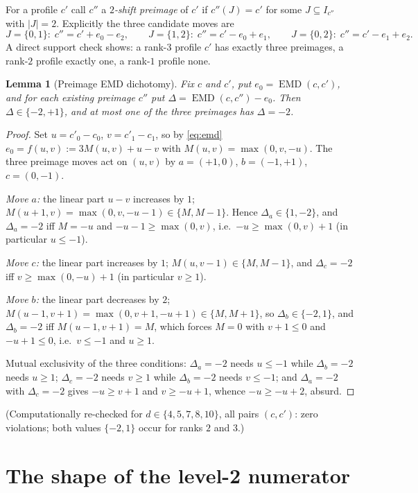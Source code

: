 \documentclass[11pt]{article}
\newtheorem{lemma}[theorem]{Lemma}
\newcommand{\EMD}{\operatorname{EMD}}
\begin{document}
For a profile $c'$ call $c''$ a \emph{$2$-shift preimage} of $c'$ if
$c''(J)=c'$ for some $J\subseteq I_{c''}$ with $|J|=2$. Explicitly the three
candidate moves are
\[
J=\{0,1\}:\; c''=c'+e_0-e_2,\qquad
J=\{1,2\}:\; c''=c'-e_0+e_1,\qquad
J=\{0,2\}:\; c''=c'-e_1+e_2 .
\]
A direct support check shows: a rank-$3$ profile $c'$ has exactly three
preimages, a rank-$2$ profile exactly one, a rank-$1$ profile none.

\begin{lemma}[Preimage EMD dichotomy]\label{lem:dichotomy}
Fix $c$ and $c'$, put $e_0=\EMD(c,c')$, and for each existing preimage $c''$
put $\Delta=\EMD(c,c'')-e_0$. Then $\Delta\in\{-2,+1\}$, and at most one of
the three preimages has $\Delta=-2$.
\end{lemma}

\begin{proof}
Set $u=c'_0-c_0$, $v=c'_1-c_1$, so by \eqref{eq:emd}
$e_0=f(u,v):=3M(u,v)+u-v$ with $M(u,v)=\max(0,v,-u)$. The three preimage
moves act on $(u,v)$ by $a=(+1,0)$, $b=(-1,+1)$, $c=(0,-1)$.

\emph{Move $a$:} the linear part $u-v$ increases by $1$;
$M(u+1,v)=\max(0,v,-u-1)\in\{M,M-1\}$. Hence $\Delta_a\in\{1,-2\}$, and
$\Delta_a=-2$ iff $M=-u$ and $-u-1\ge\max(0,v)$, i.e.\
$-u\ge\max(0,v)+1$ (in particular $u\le-1$).

\emph{Move $c$:} the linear part increases by $1$;
$M(u,v-1)\in\{M,M-1\}$, and $\Delta_c=-2$ iff $v\ge\max(0,-u)+1$
(in particular $v\ge1$).

\emph{Move $b$:} the linear part decreases by $2$;
$M(u-1,v+1)=\max(0,v+1,-u+1)\in\{M,M+1\}$, so $\Delta_b\in\{-2,1\}$, and
$\Delta_b=-2$ iff $M(u-1,v+1)=M$, which forces $M=0$ with $v+1\le0$ and
$-u+1\le0$, i.e.\ $v\le-1$ and $u\ge1$.

Mutual exclusivity of the three conditions: $\Delta_a=-2$ needs $u\le-1$
while $\Delta_b=-2$ needs $u\ge1$; $\Delta_c=-2$ needs $v\ge1$ while
$\Delta_b=-2$ needs $v\le-1$; and $\Delta_a=-2$ with $\Delta_c=-2$ gives
$-u\ge v+1$ and $v\ge -u+1$, whence $-u\ge -u+2$, absurd.
\end{proof}

(Computationally re-checked for $d\in\{4,5,7,8,10\}$, all pairs $(c,c')$:
zero violations; both values $\{-2,1\}$ occur for ranks $2$ and $3$.)

\section{The shape of the level-2 numerator}
\end{document}
